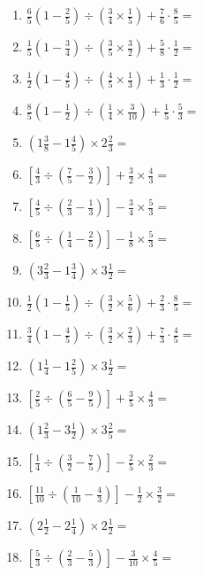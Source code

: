 \documentclass[12pt]{article}
\begin{document}
\begin{enumerate}[ itemsep=1.5cm]
	\item $\displaystyle \frac{6}{5} \left( 1 - \frac{2}{5} \right) \div \left( \frac{3}{4} \times \frac{1}{5} \right) + \frac{7}{6} \cdot \frac{8}{5} =$
	\item $\displaystyle \frac{1}{5} \left( 1 - \frac{3}{4} \right) \div \left( \frac{3}{5} \times \frac{3}{2} \right) + \frac{5}{8} \cdot \frac{1}{2} =$
	\item $\displaystyle \frac{1}{2} \left( 1 - \frac{4}{5} \right) \div \left( \frac{4}{5} \times \frac{1}{3} \right) + \frac{1}{3} \cdot \frac{1}{2} =$
	\item $\displaystyle \frac{8}{5} \left( 1 - \frac{1}{2} \right) \div \left( \frac{1}{4} \times \frac{3}{10} \right) + \frac{1}{5} \cdot \frac{5}{3} =$
	\item $\displaystyle \left( 1 \frac{3}{8} - 1 \frac{4}{5} \right) \times 2 \frac{2}{3} =$
	\item $\displaystyle \left[ \frac{4}{3} \div \left( \frac{7}{5} - \frac{3}{2} \right) \right] + \frac{3}{2} \times \frac{4}{3} =$
	\item $\displaystyle \left[ \frac{4}{5} \div \left( \frac{2}{3} - \frac{1}{3} \right) \right] - \frac{3}{4} \times \frac{5}{3} =$
	\item $\displaystyle \left[ \frac{6}{5} \div \left( \frac{1}{4} - \frac{2}{5} \right) \right] - \frac{1}{8} \times \frac{5}{3} =$
	\item $\displaystyle \left( 3 \frac{2}{3} - 1 \frac{3}{4} \right) \times 3 \frac{1}{2} =$

	\item $\displaystyle \frac{1}{2} \left( 1 - \frac{1}{5} \right) \div \left( \frac{3}{2} \times \frac{5}{6} \right) + \frac{2}{3} \cdot \frac{8}{5} =$
	\item $\displaystyle \frac{3}{4} \left( 1 - \frac{4}{5} \right) \div \left( \frac{3}{2} \times \frac{2}{3} \right) + \frac{7}{3} \cdot \frac{4}{5} =$
	\item $\displaystyle \left( 1 \frac{1}{4} - 1 \frac{2}{5} \right) \times 3 \frac{1}{2} =$
	\item $\displaystyle \left[ \frac{2}{5} \div \left( \frac{6}{5} - \frac{9}{5} \right) \right] + \frac{3}{5} \times \frac{4}{3} =$
	\item $\displaystyle \left( 1 \frac{2}{3} - 3 \frac{1}{2} \right) \times 3 \frac{2}{5} =$
	\item $\displaystyle \left[ \frac{1}{4} \div \left( \frac{3}{2} - \frac{7}{5} \right) \right] - \frac{2}{5} \times \frac{2}{3} =$
	\item $\displaystyle \left[ \frac{11}{10} \div \left( \frac{1}{10} - \frac{4}{3} \right) \right] - \frac{1}{2} \times \frac{3}{2} =$
	\item $\displaystyle \left( 2 \frac{1}{2} - 2 \frac{1}{4} \right) \times 2 \frac{1}{2} =$
	\item $\displaystyle \left[ \frac{5}{3} \div \left( \frac{2}{3} - \frac{5}{3} \right) \right] - \frac{3}{10} \times \frac{4}{5} =$


\end{enumerate}
\end{document}
